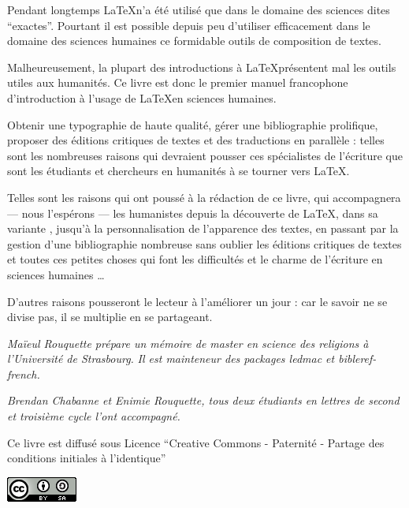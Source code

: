 \thispagestyle{empty}

Pendant longtemps \LaTeX n'a été utilisé que dans le domaine des sciences dites \enquote{exactes}.
Pourtant il est possible depuis peu d'utiliser efficacement dans le domaine des sciences humaines ce formidable outils de composition de textes.

Malheureusement, la plupart des introductions à \LaTeX présentent mal les outils utiles aux humanités. Ce livre est donc le premier manuel francophone d'introduction à l'usage de \LaTeX en sciences humaines.

Obtenir une typographie de haute qualité, gérer une bibliographie prolifique, proposer des éditions critiques de textes et des traductions en parallèle : telles sont les nombreuses raisons qui devraient pousser ces spécialistes de l'écriture que sont les étudiants et chercheurs en humanités à se tourner vers \LaTeX.

Telles sont les raisons qui ont poussé à la rédaction de ce livre, qui accompagnera --- nous l'espérons --- les humanistes depuis la découverte de \LaTeX, dans sa variante \XeLaTeX, jusqu'à la personnalisation de l'apparence des textes, en passant par la gestion d'une bibliographie nombreuse sans oublier les éditions critiques de textes et toutes ces petites choses qui font les difficultés et le charme de l'écriture en sciences humaines \ldots

D'autres raisons pousseront le lecteur à l'améliorer un jour : car le savoir ne se divise pas, il se multiplie en se partageant.

\vspace{4ex}

\scriptsize
\emph{
Maïeul Rouquette prépare un mémoire de master en science des religions à l'Université de Strasbourg.} 
\emph{Il est mainteneur des packages \emph{ledmac} et \emph{bibleref-french}.}


\emph{Brendan Chabanne et Enimie Rouquette, tous deux étudiants en lettres de second et troisième cycle  l'ont accompagné.}

\normalsize

\vspace{4ex}
Ce livre est diffusé sous Licence \enquote{Creative Commons - Paternité - Partage des conditions initiales à l'identique}

\vspace{2ex}
 \raggedleft\includegraphics[height=3ex]{images/cc.png}
